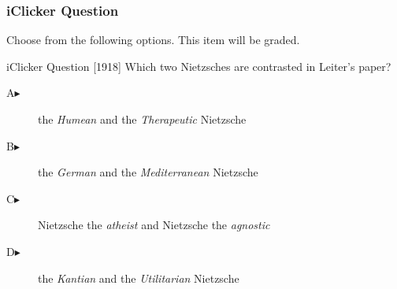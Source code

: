 \begin{frame}
  \frametitle{iClicker Question}
Choose from the following options. This item will be graded.
\begin{block}{iClicker Question}
[1918] Which two Nietzsches are contrasted in Leiter's paper?
\end{block}
\begin{description}
\item[A\hspace{.2in}$\blacktriangleright$] the \emph{Humean} and the \emph{Therapeutic} Nietzsche
\item[B\hspace{.2in}$\blacktriangleright$] the \emph{German} and the \emph{Mediterranean} Nietzsche
\item[C\hspace{.2in}$\blacktriangleright$] Nietzsche the \emph{atheist} and Nietzsche the \emph{agnostic}
\item[D\hspace{.2in}$\blacktriangleright$] the \emph{Kantian} and the \emph{Utilitarian} Nietzsche
\end{description}
\end{frame}
